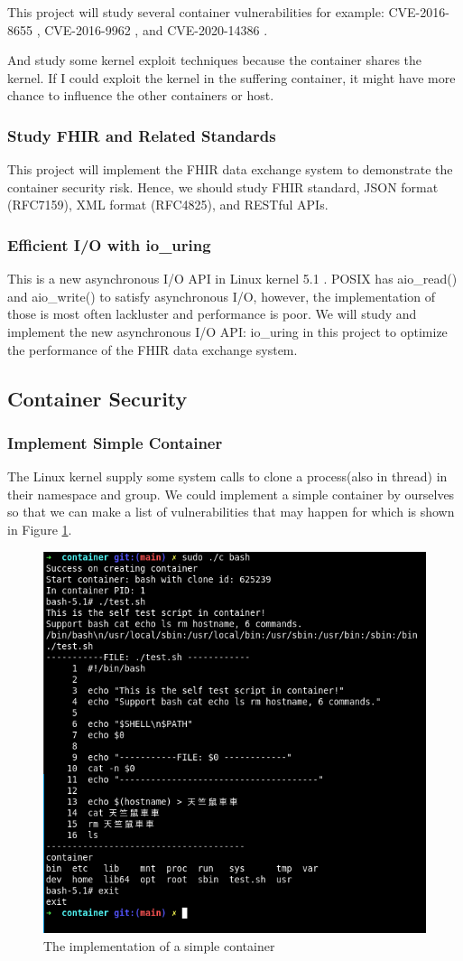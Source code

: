 \documentclass[12pt,a4paper]{article}
\begin{document}
This project will study several container vulnerabilities for example: CVE-2016-8655
\cite{CVE-2016-8655}, CVE-2016-9962 \cite{CVE-2016-9962}, and CVE-2020-14386 \cite{CVE-2020-14386}.

And study some kernel exploit techniques \cite{Kernel_exploitation} because the container shares
the kernel. If I could exploit the kernel in the suffering container, it might have more chance
to influence the other containers or host.

\subsubsection{Study FHIR and Related Standards}
This project will implement the FHIR \cite{FHIR_home} data exchange system to demonstrate the container
security risk. Hence, we should study FHIR standard, JSON format (RFC7159), XML format (RFC4825), and
RESTful APIs.

\subsubsection{Efficient I/O with io\_uring}
This is a new asynchronous I/O API in Linux kernel 5.1 \cite{Efficient_IO_uring}. POSIX has
aio\_read() and aio\_write() to satisfy asynchronous I/O, however, the implementation of those
is most often lackluster and performance is poor. We will study and implement the new asynchronous
I/O API: io\_uring in this project to optimize the performance of the FHIR data exchange system.

\subsection{Container Security}
\subsubsection{Implement Simple Container}
The Linux kernel supply some system calls to clone a process(also in thread) in their namespace
and group. We could implement a simple container by ourselves so that we can make a list of
vulnerabilities that may happen for which is shown in Figure \ref*{Fig:sc}.

\begin{figure}
  \includegraphics[width=.5\textwidth]{Screenshot from 2021-02-09 19-45-29.png}
  \caption{The implementation of a simple container}
  \label{Fig:sc}
\end{figure}
\end{document}
